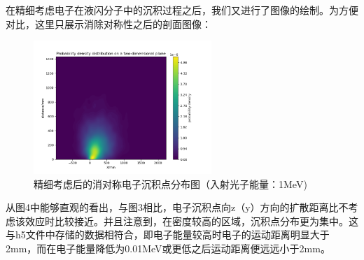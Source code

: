 \documentclass[12pt,a4paper]{article}%
\begin{document}
        在精细考虑电子在液闪分子中的沉积过程之后，我们又进行了图像的绘制。为方便对比，这里只展示消除对称性之后的剖面图像：
        
        \begin{figure}[hb]
            \centering
            \includegraphics[width=0.6\textwidth]{deposit_Bethe_dissymmetry.png}
            \caption{精细考虑后的消对称电子沉积点分布图（入射光子能量：1MeV)}
            \label{fig:deposit_dissymmetry_Bethe}
        \end{figure}
        
        从图4中能够直观的看出，与图3相比，电子沉积点向z（y）方向的扩散距离比不考虑该效应时比较接近。并且注意到，在密度较高的区域，沉积点分布更为集中。这与h5文件中存储的数据相符合，即电子能量较高时电子的运动距离明显大于2mm，而在电子能量降低为0.01MeV或更低之后运动距离便远远小于2mm。
\end{document}
